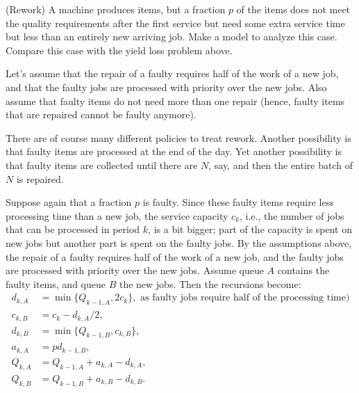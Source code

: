\begin{exercise}
  (Rework) A machine produces items, but a fraction $p$ of the items
  does not meet the quality requirements after the first service but
  need some extra service time but less than an entirely new arriving
  job. Make a model to analyze this case. Compare this case with the
  yield loss problem above. 

  Let's assume that the repair of a faulty requires half of the work
  of a new job, and that the faulty jobs are processed with priority
  over the new jobs.  Also assume that faulty items do not need more than one repair (hence, faulty items that are repaired cannot be faulty anymore).

There are of course many different policies to
  treat rework.   Another possibility is that faulty items are processed at the end of
  the day. Yet another possibility is that faulty items are collected
  until there are $N$, say, and then the entire batch of $N$ is
  repaired.
  \begin{solution}
    Suppose again that a fraction $p$ is faulty. Since these faulty
    items require less processing time than a new job, the service
    capacity $c_k$, i.e., the number of jobs that can be processed in
    period $k$, is a bit bigger; part of the capacity is spent on new
    jobs but another part is spent on the faulty jobs. By the
    assumptions above, the repair of a faulty requires half of the
    work of a new job, and the faulty jobs are processed with priority
    over the new jobs. Assume queue $A$ contains the faulty items, and
    queue $B$ the new jobs. Then the recursions become:
\begin{equation*}
  \begin{split}
    d_{k,A} &= \min\{Q_{k-1, A}, 2c_k\}, \text{ as faulty jobs require half of the processing time})\\
    c_{k,B} &= c_k - d_{k,A}/2, \\
    d_{k,B} &= \min\{Q_{k-1, B}, c_{k,B}\}, \\
    a_{k,A} &= p d_{k-1, B}, \\
    Q_{k,A} &= Q_{k-1, A} + a_{k,A} - d_{k,A}, \\
    Q_{k,B} &= Q_{k-1, B} + a_{k,B} - d_{k,B}.
  \end{split}
\end{equation*}
  \end{solution}
\end{exercise}


